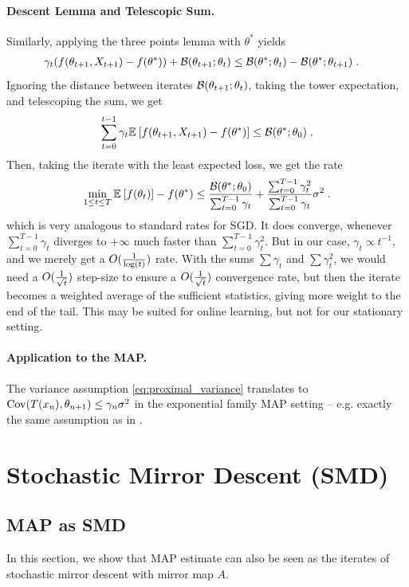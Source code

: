 \documentclass{article}
\newcommand*{\expect}[2][]{\ensuremath{\mathbb{E}_{#1} \left[ #2 \right] }} %
\newcommand{\logpart}{A}
\newcommand{\nat}{\theta}
\newcommand{\lr}{\gamma} %
\begin{document}
\paragraph{Descent Lemma and Telescopic Sum.}
Similarly, applying the three points lemma with $\nat^*$ yields
\begin{align}
	\lr_t(f(\nat_{t+1},X_{t+1}) - f(\nat^*)) +  \cB(\nat_{t+1} ; \nat_{t})
	&\leq  \cB( \nat^*; \nat_{t})  - \cB( \nat^*; \nat_{t+1}) \; .
\end{align}
Ignoring the distance between iterates $\cB(\nat_{t+1} ; \nat_{t})
$, taking the tower expectation, and telescoping the sum, we get
\begin{align}
	\sum_{t=0}^{t-1} \lr_t \expect{f(\nat_{t+1},X_{t+1}) - f(\nat^*)}
	\leq \cB( \nat^*; \nat_{0})  \; .
\end{align}
Then, taking the iterate with the least expected loss, we get the rate
\begin{align}
	 \min_{1\leq t \leq T} \expect{ f(\nat_t)} - f(\nat^*)
	\leq \frac{\cB( \nat^*; \nat_{0}) }{\sum_{t=0}^{T-1} \lr_t}
	+ \frac{\sum_{t=0}^{T-1} \lr_t^2  }{\sum_{t=0}^{T-1} \lr_t} \sigma^2 \; .
\end{align}
which is very analogous to standard rates for SGD.
It does converge, whenever $\sum_{t=0}^{T-1} \lr_t$ diverges to $+\infty$ much faster than $\sum_{t=0}^{T-1} \lr_t^2$.
But in our case, $\lr_t \propto t^{-1}$, and we merely get a $O(\frac{1}{\log(t)})$ rate.
With the sums  $\sum \lr_t$ and $\sum \lr_t^2$, we would need a $O(\frac{1}{\sqrt{t}})$ step-size to ensure a $O(\frac{1}{\sqrt{t}})$ convergence rate, but then the iterate becomes a weighted average of the sufficient statistics, giving more weight to the end of the tail. This may be suited for online learning, but not for our stationary setting.

\paragraph{Application to the MAP.}
The variance assumption \eqref{eq:proximal_variance} translates to $\Cov(T(x_{n}) , \nat_{n+1}) \leq  \gamma_n \sigma^2$ in the exponential family MAP setting -- e.g. exactly the same assumption as in \citet{hanzely2018fastest}.


\section{Stochastic Mirror Descent (SMD)}
\subsection{MAP as SMD}
In this section, we show that MAP estimate can also be seen as the iterates of stochastic mirror descent with mirror map $\logpart$.
\end{document}
